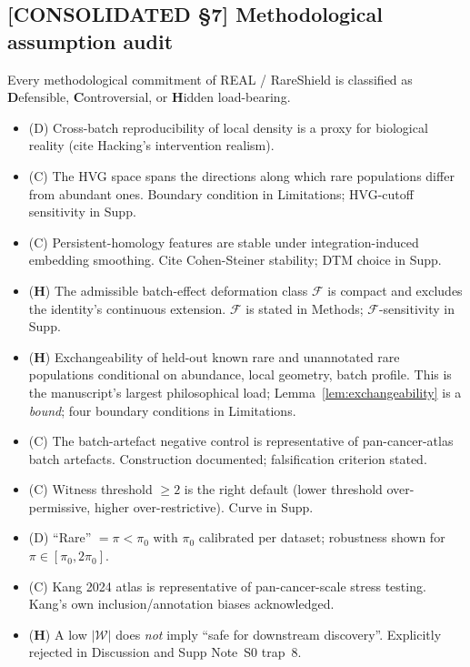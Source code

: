 \subsection*{[CONSOLIDATED §7] Methodological assumption audit}
\label{philo:assumption_audit}

Every methodological commitment of REAL / RareShield is classified as \textbf{D}efensible, \textbf{C}ontroversial, or \textbf{H}idden load-bearing.

\begin{itemize}[leftmargin=*]
  \item (D) Cross-batch reproducibility of local density is a proxy for biological reality (cite Hacking's intervention realism).
  \item (C) The HVG space spans the directions along which rare populations differ from abundant ones. Boundary condition in Limitations; HVG-cutoff sensitivity in Supp.
  \item (C) Persistent-homology features are stable under integration-induced embedding smoothing. Cite Cohen-Steiner stability; DTM choice in Supp.
  \item (\textbf{H}) The admissible batch-effect deformation class $\mathcal{F}$ is compact and excludes the identity's continuous extension. $\mathcal{F}$ is stated in Methods; $\mathcal{F}$-sensitivity in Supp.
  \item (\textbf{H}) Exchangeability of held-out known rare and unannotated rare populations conditional on abundance, local geometry, batch profile. This is the manuscript's largest philosophical load; Lemma~\ref{lem:exchangeability} is a \emph{bound}; four boundary conditions in Limitations.
  \item (C) The batch-artefact negative control is representative of pan-cancer-atlas batch artefacts. Construction documented; falsification criterion stated.
  \item (C) Witness threshold $\geq 2$ is the right default (lower threshold over-permissive, higher over-restrictive). Curve in Supp.
  \item (D) ``Rare'' $= \pi < \pi_0$ with $\pi_0$ calibrated per dataset; robustness shown for $\pi \in [\pi_0, 2\pi_0]$.
  \item (C) Kang 2024 atlas is representative of pan-cancer-scale stress testing. Kang's own inclusion/annotation biases acknowledged.
  \item (\textbf{H}) A low $|\mathcal{W}|$ does \emph{not} imply ``safe for downstream discovery''. Explicitly rejected in Discussion and Supp Note~S0 trap~8.
\end{itemize}

